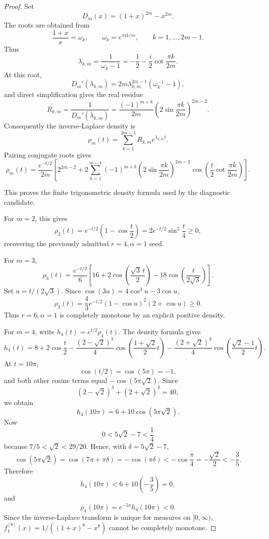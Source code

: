 \begin{proof}
Set
\[
D_m(x)=(1+x)^{2m}-x^{2m}.
\]
The roots are obtained from
\[
\frac{1+x}{x}=\omega_k,\qquad
\omega_k=e^{\pi i k/m},\qquad k=1,\ldots,2m-1.
\]
Thus
\[
\lambda_{k,m}
=\frac{1}{\omega_k-1}
=-\frac12-\frac{i}{2}\cot\frac{\pi k}{2m}.
\]
At this root,
\[
D_m'(\lambda_{k,m})
=2m\lambda_{k,m}^{2m-1}(\omega_k^{-1}-1),
\]
and direct simplification gives the real residue
\[
R_{k,m}
=\frac{1}{D_m'(\lambda_{k,m})}
=\frac{(-1)^{m+k}}{2m}
\left(2\sin\frac{\pi k}{2m}\right)^{2m-2}.
\]
Consequently the inverse-Laplace density is
\[
\rho_m(t)
=\sum_{k=1}^{2m-1}R_{k,m}e^{\lambda_{k,m}t}.
\]
Pairing conjugate roots gives
\[
\rho_m(t)
=\frac{e^{-t/2}}{2m}
\left[
2^{2m-2}
+2\sum_{k=1}^{m-1}
(-1)^{m+k}
\left(2\sin\frac{\pi k}{2m}\right)^{2m-2}
\cos\!\left(
\frac{t}{2}\cot\frac{\pi k}{2m}
\right)
\right].
\]

This proves the finite trigonometric density formula used by the diagnostic
candidate.

For \(m=2\), this gives
\[
\rho_2(t)=e^{-t/2}\left(1-\cos\frac t2\right)
=2e^{-t/2}\sin^2\frac t4\ge0,
\]
recovering the previously admitted \(r=4,\alpha=1\) seed.

For \(m=3\),
\[
\rho_3(t)
=\frac{e^{-t/2}}6
\left[
16+2\cos\left(\frac{\sqrt3\,t}{2}\right)
-18\cos\left(\frac{t}{2\sqrt3}\right)
\right].
\]
Set \(u=t/(2\sqrt3)\).  Since
\(\cos(3u)=4\cos^3u-3\cos u\),
\[
\rho_3(t)
=\frac{4}{3}e^{-t/2}(1-\cos u)^2(2+\cos u)\ge0.
\]
Thus \(r=6,\alpha=1\) is completely monotone by an explicit positive density.

For \(m=4\), write \(h_4(t)=e^{t/2}\rho_4(t)\).  The density formula gives
\[
h_4(t)
=8+2\cos\frac t2
-\frac{(2-\sqrt2)^3}{4}
\cos\left(\frac{1+\sqrt2}{2}t\right)
-\frac{(2+\sqrt2)^3}{4}
\cos\left(\frac{\sqrt2-1}{2}t\right).
\]
At \(t=10\pi\),
\[
\cos(t/2)=\cos(5\pi)=-1,
\]
and both other cosine terms equal \(-\cos(5\pi\sqrt2)\).  Since
\[
(2-\sqrt2)^3+(2+\sqrt2)^3=40,
\]
we obtain
\[
h_4(10\pi)=6+10\cos(5\pi\sqrt2).
\]
Now
\[
0<5\sqrt2-7<\frac14
\]
because \(7/5<\sqrt2<29/20\).  Hence, with
\(\delta=5\sqrt2-7\),
\[
\cos(5\pi\sqrt2)=\cos(7\pi+\pi\delta)=-\cos(\pi\delta)
<-\cos\frac\pi4=-\frac{\sqrt2}{2}<-\frac35.
\]
Therefore
\[
h_4(10\pi)<6+10\left(-\frac35\right)=0,
\]
and
\[
\rho_4(10\pi)=e^{-5\pi}h_4(10\pi)<0.
\]
Since the inverse-Laplace transform is unique for measures on
\([0,\infty)\), \(f^{[8]}_1(x)=1/((1+x)^8-x^8)\) cannot be completely monotone.
\end{proof}

